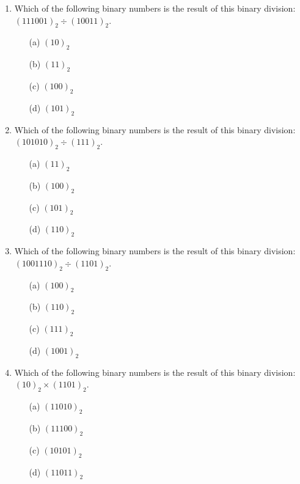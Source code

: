 \documentclass[]{report}
\begin{document}
\begin{enumerate}
		\item Which of the following binary numbers is the result of this binary division: $(111001)_{2} \div ( 10011)_{2}$. %
		\begin{multicols}{2}
			\begin{itemize}
				\item[(a)] $(10)_2$ %
				\item[(b)] $(11)_{2}$ %
				\item[(c)] $(100)_{2}$ %
				\item[(d)] $(101)_{2}$ %
			\end{itemize}
		\end{multicols}
		\item Which of the following binary numbers is the result of this binary division: $(101010)_{2} \div ( 111 )_{2}$. %
		\begin{multicols}{2}
			\begin{itemize}
				\item[(a)] $(11)_2$ %
				\item[(b)] $(100)_{2}$ %
				\item[(c)] $(101)_{2}$ %
				\item[(d)] $(110)_{2}$ %
			\end{itemize}
		\end{multicols}
		\item Which of the following binary numbers is the result of this binary division: $(1001110)_{2} \div ( 1101 )_{2}$. %
		\begin{multicols}{2}
			\begin{itemize}
				
				\item[(a)] $(100)_{2}$ %
				\item[(b)] $(110)_{2}$ %
				\item[(c)] $(111)_{2}$ %
				\item[(d)] $(1001)_2$ %
			\end{itemize}
		\end{multicols}

	
	
\item Which of the following binary numbers is the result of this binary division: $(10)_{2} \times ( 1101)_{2}$. %
		\begin{multicols}{2}
			\begin{itemize}
				\item[(a)] $(11010)_{2}$ %
				\item[(b)] $(11100)_{2}$ %
				\item[(c)] $(10101)_{2}$ %
				\item[(d)] $(11011)_2$ %
			\end{itemize}
		\end{multicols}
		

\end{enumerate}
\end{document}
